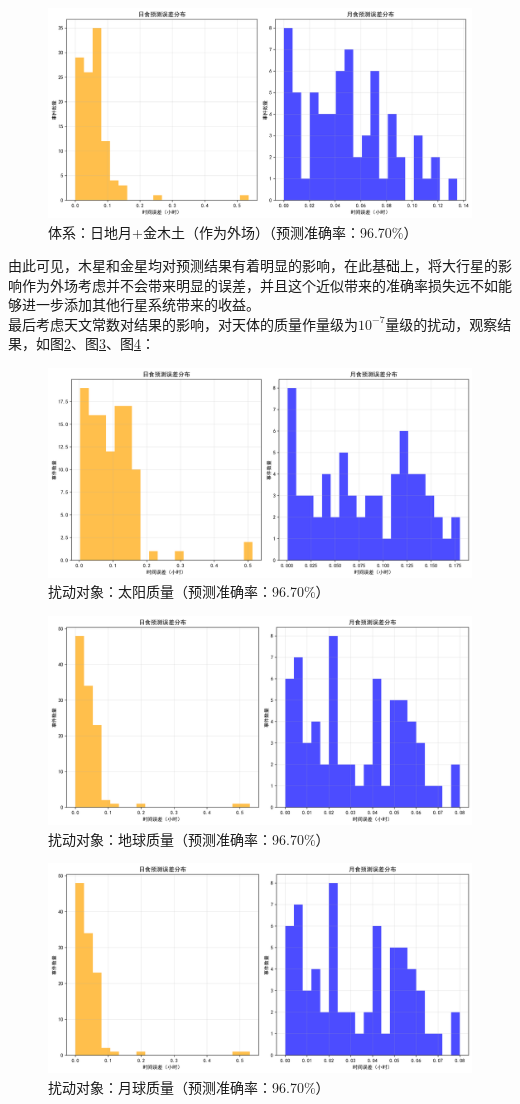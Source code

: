 \documentclass[hidelinks]{article}
\begin{document}
\begin{figure}[h]
    \centering
    \includegraphics[width=0.5\linewidth]{images/error_distribution_semjvs_aux.png}
    \caption{体系：日地月+金木土（作为外场）（预测准确率：96.70\%）}
    \label{fig:eclipse_error_semjvs_aux}
\end{figure}

由此可见，木星和金星均对预测结果有着明显的影响，在此基础上，将大行星的影响作为外场考虑并不会带来明显的误差，并且这个近似带来的准确率损失远不如能够进一步添加其他行星系统带来的收益。\\
最后考虑天文常数对结果的影响，对天体的质量作量级为$10^{-7}$量级的扰动，观察结果，如图\ref{fig:eclipse_error_sun}、图\ref{fig:eclipse_error_earth}、图\ref{fig:eclipse_error_moon}：
\begin{figure}[h]
    \centering
    \includegraphics[width=0.5\linewidth]{images/error_distribution_sun.png}
    \caption{扰动对象：太阳质量（预测准确率：96.70\%）}
    \label{fig:eclipse_error_sun}
\end{figure}

\begin{figure}[h]
    \centering
    \includegraphics[width=0.5\linewidth]{images/error_distribution_earth.png}
    \caption{扰动对象：地球质量（预测准确率：96.70\%）}
    \label{fig:eclipse_error_earth}
\end{figure}

\begin{figure}[h]
    \centering
    \includegraphics[width=0.5\linewidth]{images/error_distribution_earth.png}
    \caption{扰动对象：月球质量（预测准确率：96.70\%）}
    \label{fig:eclipse_error_moon}
\end{figure}
\end{document}
